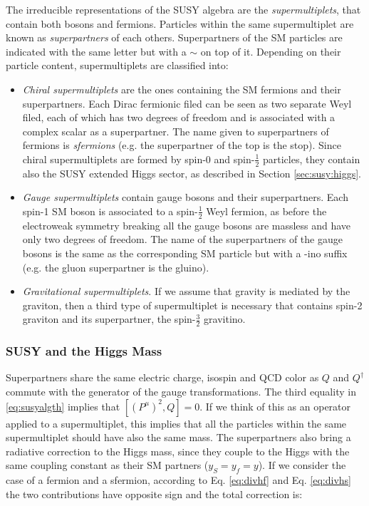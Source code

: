 The irreducible representations of the SUSY algebra are the \textit{supermultiplets}, that contain both bosons and fermions. Particles within the same supermultiplet are known as \textit{superpartners} of each others. Superpartners of the SM particles are indicated with the same letter but with a $\sim$ on top of it. Depending on their particle content, supermultiplets are classified into:

\begin{itemize}
\item \textit{Chiral supermultiplets} are the ones containing the SM fermions and their superpartners. Each Dirac fermionic filed can be seen as two separate Weyl filed, each of which has two degrees of freedom and is associated with a complex scalar as a superpartner. The name given to superpartners of fermions is \textit{sfermions} (e.g. the superpartner of the top is the stop). Since chiral supermultiplets are formed by spin-0 and spin-$\frac{1}{2}$ particles, they contain also the SUSY extended Higgs sector, as described in Section \ref{sec:susy:higgs}.

\item \textit{Gauge supermultiplets} contain gauge bosons and their superpartners. Each spin-1 SM boson is associated to a spin-$\frac{1}{2}$ Weyl fermion, as before the electroweak symmetry breaking all the gauge bosons are massless and have only two degrees of freedom. The name of the superpartners of the gauge bosons is the same as the corresponding SM particle but with a -ino suffix (e.g. the gluon superpartner is the gluino). 

\item \textit{Gravitational supermultiplets}. If we assume that gravity is mediated by the graviton, then a third type of supermultiplet is necessary that contains spin-2 graviton and its superpartner, the spin-$\frac{3}{2}$ gravitino.

\end{itemize}


\subsubsection{SUSY and the Higgs Mass}

Superpartners share the same electric charge, isospin and QCD color as $Q$ and $Q^\dagger$ commute with the generator of the gauge transformations.
The third equality in \ref{eq:susyalgth} implies that $[ (P^\mu)^2 , Q  ]=0$. If we think of this as an operator applied to a supermultiplet, this implies that all the particles within the same supermultiplet should have also the same mass. The superpartners also bring a radiative correction to the Higgs mass, since they couple to the Higgs with the same coupling constant as their SM partners ($y_S=y_f=y$). If we consider the case of a fermion and a sfermion, according to Eq. \ref{eq:divhf} and Eq. \ref{eq:divhs} the two contributions have opposite sign and the total correction is:

